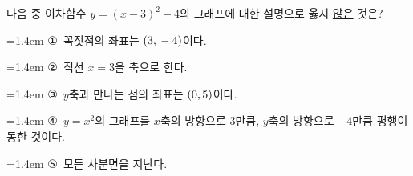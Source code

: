 다음 중 이차함수 $y=(x-3)^2-4$의 그래프에 대한 설명으로 옳지 \underline{않은} 것은?
\par\medskip\par\noindent\hangindent=1.4em {\small ①}\ 꼭짓점의 좌표는 $(3{,}\mkern3mu -4)$이다.\par\noindent\hangindent=1.4em {\small ②}\ 직선 $x=3$을 축으로 한다.\par\noindent\hangindent=1.4em {\small ③}\ $y$축과 만나는 점의 좌표는 $(0{,}\mkern3mu 5)$이다.\par\noindent\hangindent=1.4em {\small ④}\ $y=x^2$의 그래프를 $x$축의 방향으로 $3$만큼, $y$축의 방향으로 $-4$만큼 평행이동한 것이다.\par\noindent\hangindent=1.4em {\small ⑤}\ 모든 사분면을 지난다.\par\medskip
